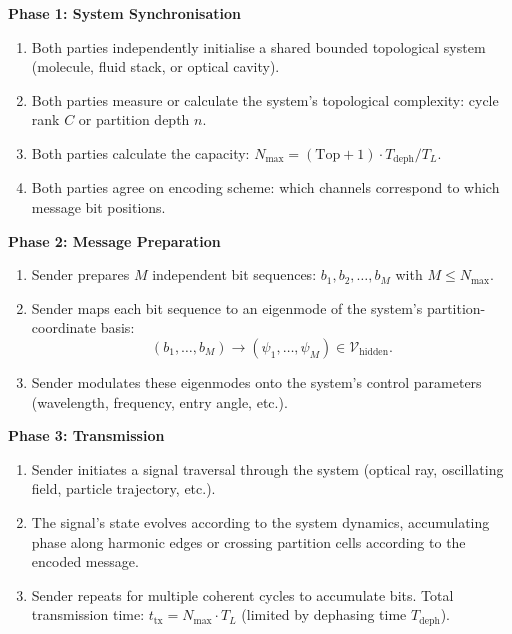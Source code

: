 \documentclass[11pt,twocolumn,a4paper]{article}
\theoremstyle{definition}
\begin{document}
\begin{protocol}
\label{prot:unified}

\textbf{Phase 1: System Synchronisation}

\begin{enumerate}[nosep,label=1.\arabic*]
\item Both parties independently initialise a shared bounded topological system (molecule, fluid stack, or optical cavity).
\item Both parties measure or calculate the system's topological complexity: cycle rank $C$ or partition depth $n$.
\item Both parties calculate the capacity: $N_{\max} = (\text{Top} + 1) \cdot T_{\text{deph}}/T_L$.
\item Both parties agree on encoding scheme: which channels correspond to which message bit positions.
\end{enumerate}

\textbf{Phase 2: Message Preparation}

\begin{enumerate}[nosep,label=2.\arabic*]
\item Sender prepares $M$ independent bit sequences: $b_1, b_2, \ldots, b_M$ with $M \leq N_{\max}$.
\item Sender maps each bit sequence to an eigenmode of the system's partition-coordinate basis:
\[
(b_1, \ldots, b_M) \rightarrow (\psi_1, \ldots, \psi_M) \in \mathcal{V}_{\text{hidden}}.
\]
\item Sender modulates these eigenmodes onto the system's control parameters (wavelength, frequency, entry angle, etc.).
\end{enumerate}

\textbf{Phase 3: Transmission}

\begin{enumerate}[nosep,label=3.\arabic*]
\item Sender initiates a signal traversal through the system (optical ray, oscillating field, particle trajectory, etc.).
\item The signal's state evolves according to the system dynamics, accumulating phase along harmonic edges or crossing partition cells according to the encoded message.
\item Sender repeats for multiple coherent cycles to accumulate bits. Total transmission time: $t_{\text{tx}} = N_{\max} \cdot T_L$ (limited by dephasing time $T_{\text{deph}}$).
\end{enumerate}


\end{protocol}
\end{document}
